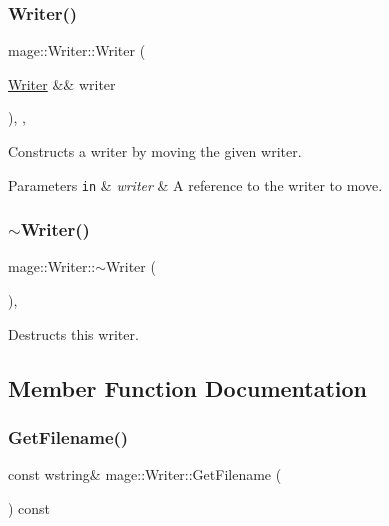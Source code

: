 \subsubsection{\texorpdfstring{Writer()}{Writer()}\hspace{0.1cm}{\footnotesize\ttfamily [3/3]}}
{\footnotesize\ttfamily mage\+::\+Writer\+::\+Writer (\begin{DoxyParamCaption}\item[{\mbox{\hyperlink{classmage_1_1_writer}{Writer}} \&\&}]{writer }\end{DoxyParamCaption})\hspace{0.3cm}{\ttfamily [protected]}, {\ttfamily [default]}, {\ttfamily [noexcept]}}

Constructs a writer by moving the given writer.


\begin{DoxyParams}[1]{Parameters}
\mbox{\tt in}  & {\em writer} & A reference to the writer to move. \\
\hline
\end{DoxyParams}
\mbox{\label{classmage_1_1_writer_aeeb30d6afb1a271b4ad294889054caec}} 
\subsubsection{\texorpdfstring{$\sim$\+Writer()}{~Writer()}}
{\footnotesize\ttfamily mage\+::\+Writer\+::$\sim$\+Writer (\begin{DoxyParamCaption}{ }\end{DoxyParamCaption})\hspace{0.3cm}{\ttfamily [protected]}, {\ttfamily [default]}}

Destructs this writer. 

\subsection{Member Function Documentation}
\mbox{\label{classmage_1_1_writer_aedbc8d5fa02444ecba2e040ca8e98281}} 
\subsubsection{\texorpdfstring{Get\+Filename()}{GetFilename()}}
{\footnotesize\ttfamily const wstring\& mage\+::\+Writer\+::\+Get\+Filename (\begin{DoxyParamCaption}{ }\end{DoxyParamCaption}) const\hspace{0.3cm}{\ttfamily [noexcept]}}


